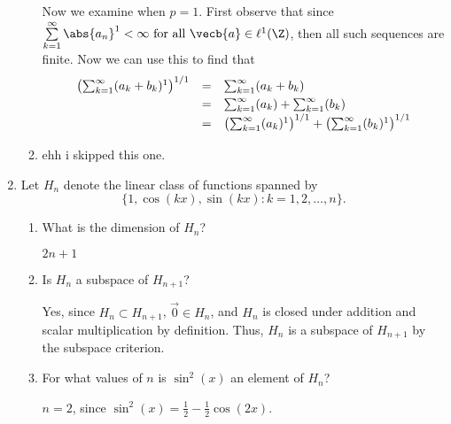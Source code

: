 \documentclass[letterpaper]{article}
\begin{document}
\begin{enumerate}[label=P\arabic*)]
\begin{enumerate}
Now we examine when $p=1$. First observe that since $\sum\limits_{k=1}^\infty \abs{a_n}^1<\infty \text{ for all } \vecb{a}\in\ell^1(\Z)$, then all such sequences are finite. Now we can use this to find that 
\[\def\arraystretch{1.25}\begin{array}{rcl}
\left(\sum_{k=1}^\infty (a_k+b_k)^1\right)^{1/1}&=&\sum_{k=1}^\infty (a_k+b_k)\\
&=&\sum_{k=1}^\infty (a_k)+\sum_{k=1}^\infty (b_k)\\
&=& \left(\sum_{k=1}^\infty (a_k)^1\right)^{1/1}+\left(\sum_{k=1}^\infty (b_k)^1\right)^{1/1	}
\end{array}\]



\item ehh i skipped this one. 
\end{enumerate}

\item Let $H_n$ denote the linear class of functions spanned by 
$$\{1, \cos(kx), \sin(kx) : k=1, 2, \dots, n\}.$$
	\begin{enumerate}
	\item What is the dimension of $H_n$? 
	
	\answer	$2n+1$
	
	\item Is $H_n$ a subspace of $H_{n+1}$?
	
	\answer Yes, since $H_n\subset H_{n+1}$, $\vec{0}\in H_n$, and $H_n$ is closed under addition and scalar multiplication by definition. Thus, $H_n$ is a subspace of $H_{n+1}$ by the subspace criterion. 
	
	\item For what values of $n$ is $\sin^2(x)$ an element of $H_n$? 
	
	\answer $n=2$, since $\sin^2(x)=\frac{1}{2}-\frac{1}{2}\cos(2x)$.

	\end{enumerate}



\end{enumerate}
\end{document}
